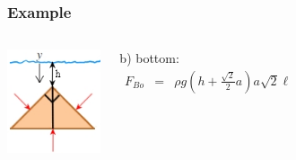 \documentclass[]{beamer}
\begin{document}
  \begin{frame}
    \frametitle{Example \theexample}
    
   
    
    \begin{columns}[c]
    
      \begin{center}
        \includegraphics[height=1.2in]{images2/example_12.97c.jpg}
      \end{center}
      
    
      \column{2.5in}
      
      b) bottom:
      \textcolor{mypink1}{
      \begin{eqnarray*}
      F_{Bo}&=&\rho g (h+\frac{\sqrt{2}}{2}a)a \sqrt{2} \ell\\
      \end{eqnarray*}
      }
      \end{columns}
    
      
    
      \end{frame}

\end{document}
